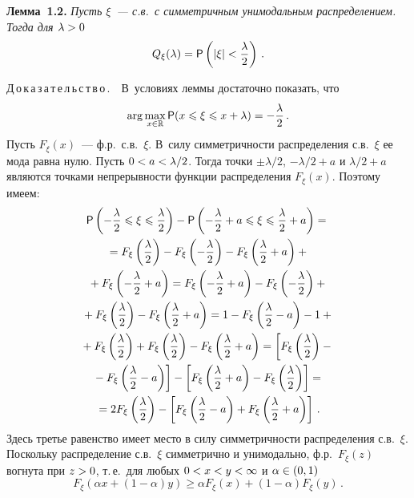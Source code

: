 \begin{multicols}{2}
\smallskip

\noindent
\textbf{Лемма~1.2.} \textit{Пусть $\xi$~--- с.в.\ с
симметричным унимодальным распределением. Тогда для $\lambda\hm>0$}
$$
Q_{\xi}(\lambda)={\sf P}\left(|\xi|<\displaystyle\frac{\displaystyle \lambda\mathstrut}{\displaystyle 2\mathstrut}\right)\,.
$$


\smallskip

\noindent
Д\,о\,к\,а\,з\,а\,т\,е\,л\,ь\,с\,т\,в\,о\,.\ \  В~условиях леммы достаточно показать, что
$$
\arg\max\limits_{x\in\mathbb{R}}{\sf P}(x\leqslant \xi\leqslant x+\lambda)=-\displaystyle\frac{\displaystyle \lambda\mathstrut}{\displaystyle 2\mathstrut}\,.
$$
Пусть $F_{\xi}(x)$~--- ф.р.\ с.в.~$\xi$. 
В~силу симметричности распределения с.в.~$\xi$
ее мода равна нулю. Пусть $0\hm<a\hm<\lambda/2$. Тогда точки
$\pm{\lambda}/{2}$, $-{\lambda}/{2}+a$ и
${\lambda}/{2}+a$ являются точками непрерывности функции
распределения $F_{\xi}(x)$. Поэтому имеем:
\begin{multline}
{\sf P}\left(-\fr{\lambda}{2}\leqslant \xi\leqslant \fr{\lambda}{2}\right)-{\sf
P}\left(-\fr{\lambda}{2}+a\leqslant \xi\leqslant \fr{\lambda}{2}+a\right)={}
\\
{}=F_{\xi}\left(\fr{\lambda}{2}\right)-
F_{\xi}\left(-\fr{\lambda}{2}\right) - F_{\xi}\left(\fr{\lambda}{2}
+a\right)+{}\\
{}+F_{\xi}\left(-\fr{\lambda}{2}+a\right)=
F_{\xi}\left(-\fr{\lambda}{2}+a\right)-
F_{\xi}\left(-\fr{\lambda}{2}\right) +{}\\
{}+
F_{\xi}\left(\fr{\lambda}{2}\right) - F_{\xi}\left(\fr{\lambda}{2} +
a\right) =
1-F_{\xi}\left(\fr{\lambda}{2}-a\right)- 1+{}\\
{}+
F_{\xi}\left(\fr{\lambda}{2}\right) +
F_{\xi}\left(\fr{\lambda}{2}\right) - F_{\xi}\left(\fr{\lambda}{2} +
a\right) =\left[F_{\xi}\left(\fr{\lambda}{2}\right)-{}\right.\\
\left.{}-
F_{\xi}\left(\fr{\lambda}{2}-a\right)\right]-
\left[F_{\xi}\left(\fr{\lambda}{2}+a\right)-
F_{\xi}\left(\fr{\lambda}{2}\right)\right]={}
\\
{}=2F_{\xi}\left(\fr{\lambda}{2}\right)-
\left[F_{\xi}\left(\fr{\lambda}{2}-a\right)+
F_{\xi}\left(\fr{\lambda}{2}+a\right)\right]\,.
\label{e1.6-ben}
\end{multline}
Здесь третье равенство имеет место в силу сим\-мет\-рич\-ности
распределения с.в.~$\xi$. Поскольку распределение
с.в.~$\xi$ симметрично и унимодально, ф.р.\ $F_{\xi}(z)$ вогнута при $z\hm>0$, т.\,е.\ для любых $0\hm<
x\hm<y\hm<\infty$ и $\alpha\hm\in(0,1)$
\begin{equation}
F_{\xi}\left(\alpha x+(1-\alpha)y\right)\geqslant\alpha F_{\xi}(x)+(1-
\alpha)F_{\xi}(y)\,.

\end{equation}
\end{multicols}
